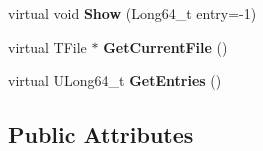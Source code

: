 \begin{DoxyCompactItemize}
\item 
\hypertarget{classwcsimT_a06c6f67b01821198df4cc82c5a402f9e}{
virtual void {\bfseries Show} (Long64\_\-t entry=-\/1)}
\label{classwcsimT_a06c6f67b01821198df4cc82c5a402f9e}

\item 
\hypertarget{classwcsimT_ae1dcde31e47d1aedfd86ea416451edb3}{
virtual TFile $\ast$ {\bfseries GetCurrentFile} ()}
\label{classwcsimT_ae1dcde31e47d1aedfd86ea416451edb3}

\item 
\hypertarget{classwcsimT_a765b878cadbd7c69f0f1a08e40ee50c0}{
virtual ULong64\_\-t {\bfseries GetEntries} ()}
\label{classwcsimT_a765b878cadbd7c69f0f1a08e40ee50c0}

\end{DoxyCompactItemize}
\subsection*{Public Attributes}
